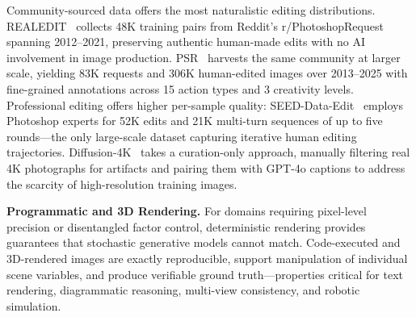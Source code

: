 \documentclass{llmxive}
\begin{document}
Community-sourced data offers the most naturalistic editing distributions. REALEDIT~\citep{sushko2025realedit} collects 48K training pairs from Reddit's r/PhotoshopRequest spanning 2012--2021, preserving authentic human-made edits with no AI involvement in image production. PSR~\citep{taesiri2025understanding} harvests the same community at larger scale, yielding 83K requests and 306K human-edited images over 2013--2025 with fine-grained annotations across 15 action types and 3 creativity levels. Professional editing offers higher per-sample quality: SEED-Data-Edit~\citep{ge2024seed} employs Photoshop experts for 52K edits and 21K multi-turn sequences of up to five rounds---the only large-scale dataset capturing iterative human editing trajectories. Diffusion-4K~\citep{zhang2025diffusion} takes a curation-only approach, manually filtering real 4K photographs for artifacts and pairing them with GPT-4o captions to address the scarcity of high-resolution training images.

\textbf{Programmatic and 3D Rendering.}
For domains requiring pixel-level precision or disentangled factor control, deterministic rendering provides guarantees that stochastic generative models cannot match. Code-executed and 3D-rendered images are exactly reproducible, support manipulation of individual scene variables, and produce verifiable ground truth---properties critical for text rendering, diagrammatic reasoning, multi-view consistency, and robotic simulation.
\end{document}
